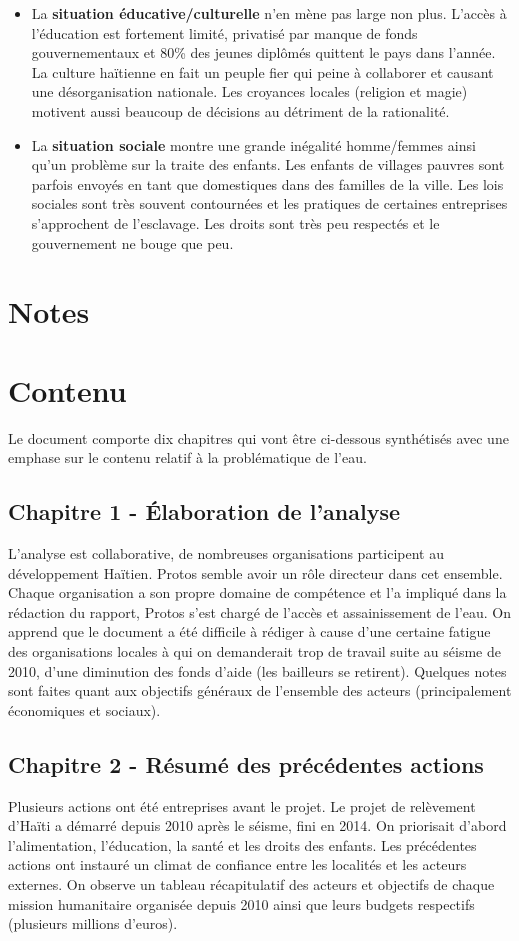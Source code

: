 \documentclass[a4paper, 11pt]{article}
\begin{document}
\begin{itemize}
  \item La \textbf{situation éducative/culturelle} n'en mène pas large non plus. L'accès à l'éducation est fortement limité, privatisé par manque de fonds gouvernementaux et 80\% des jeunes diplômés quittent le pays dans l'année. La culture haïtienne en fait un peuple fier qui peine à collaborer et causant une désorganisation nationale. Les croyances locales (religion et magie) motivent aussi beaucoup de décisions au détriment de la rationalité.
  \item La \textbf{situation sociale} montre une grande inégalité homme/femmes ainsi qu'un problème sur la traite des enfants. Les enfants de villages pauvres sont parfois envoyés en tant que domestiques dans des familles de la ville. Les lois sociales sont très souvent contournées et les pratiques de certaines entreprises s'approchent de l'esclavage. Les droits sont très peu respectés et le gouvernement ne bouge que peu.
\end{itemize}

\section*{Notes}

\section*{Contenu}
Le document comporte dix chapitres qui vont être ci-dessous synthétisés avec une emphase sur le contenu relatif à la problématique de l'eau.
  \subsection*{Chapitre 1 - \'Elaboration de l'analyse}
  L'analyse est collaborative, de nombreuses organisations participent au développement Haïtien. Protos semble avoir un rôle directeur dans cet ensemble. Chaque organisation a son propre domaine de compétence et l'a impliqué dans la rédaction du rapport, Protos s'est chargé de l'accès et assainissement de l'eau. On apprend que le document a été difficile à rédiger à cause d'une certaine fatigue des organisations locales à qui on demanderait trop de travail suite au séisme de 2010, d'une diminution des fonds d'aide (les bailleurs se retirent). Quelques notes sont faites quant aux objectifs généraux de l'ensemble des acteurs (principalement économiques et sociaux).

  \subsection*{Chapitre 2 - Résumé des précédentes actions}
  Plusieurs actions ont été entreprises avant le projet. Le projet de relèvement d'Haïti a démarré depuis 2010 après le séisme, fini en 2014. On priorisait d'abord l'alimentation, l'éducation, la santé et les droits des enfants. Les précédentes actions ont instauré un climat de confiance entre les localités et les acteurs externes. On observe un tableau récapitulatif des acteurs et objectifs de chaque mission humanitaire organisée depuis 2010 ainsi que leurs budgets respectifs (plusieurs millions d'euros).
\end{document}
